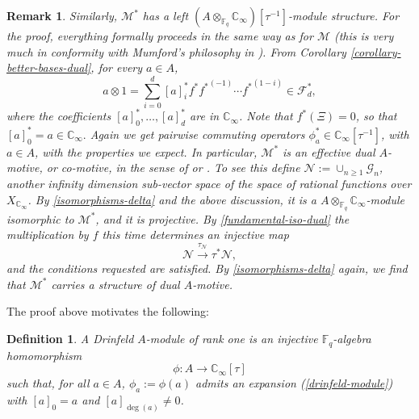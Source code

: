 \documentclass[11pt]{amsart}
\numberwithin{equation}{section}
\newcommand{\FF}{\mathbb{F}}
\newcommand{\CC}{\mathbb{C}}
\newtheorem{Definition}[Theorem]{Definition}
\newtheorem{Remark}[Theorem]{Remark}
\begin{document}
\begin{Remark}{\em 
Similarly, $\mathcal{M}^*$ has a left $(A\otimes_{\FF_q}\CC_\infty)[\tau^{-1}]$-module structure. For the proof, everything formally proceeds in the same way as for $\mathcal{M}$ (this is very much in conformity with Mumford's philosophy in \cite{MUM}). From Corollary \ref{corollary-better-bases-dual}, for every $a\in A$, 
$$a\otimes1=\sum_{i=0}^{d}[a]^*_i{f^*}{f^*}^{(-1)}\cdots {f^*}^{(1-i)}\in\mathcal{F}^*_d,$$
where the coefficients $[a]^*_0,\ldots,[a]^*_d$ are in $\CC_\infty$. Note that $f^*(\Xi)=0$, so that
$[a]^*_0=a\in\CC_\infty.$ Again we get pairwise commuting operators
$\phi^*_a\in\CC_\infty[\tau^{-1}]$, with $a\in A$, with the properties we expect. In particular, $\mathcal{M}^*$ is an {\em effective dual $A$-motive}, or {\em co-motive}, in the sense of \cite[Definition 2.4.1]{HAR&JUS} or \cite[Definition 3.6]{GAZ&MAU}. To see this define $\mathcal{N}:=\cup_{n\geq1}\mathcal{G}_n$, another infinity dimension sub-vector space of the space of rational functions over $X_{\CC_\infty}$. By \eqref{isomorphisms-delta} and the above discussion, it is a $A\otimes_{\FF_q}\CC_\infty$-module isomorphic to $\mathcal{M}^*$, and it is projective. By \eqref{fundamental-iso-dual} the multiplication by $f$ this time determines an injective map 
$$\mathcal{N}\xrightarrow{\tau_\mathcal{N}}\tau^*\mathcal{N},$$ and the conditions requested are satisfied. By \eqref{isomorphisms-delta} again, we find that $\mathcal{M}^*$ carries a structure of dual $A$-motive.
}
\end{Remark}

The proof above motivates the following:

\begin{Definition}\label{definition-Drinfeld}{\em A {\em Drinfeld $A$-module of rank one} is an injective $\FF_q$-algebra homomorphism
$$\phi: A\rightarrow\CC_\infty[\tau]$$
such that, for all $a\in A$, $\phi_a:=\phi(a)$ admits an expansion (\ref{drinfeld-module}) with $[a]_0=a$ and $[a]_{\deg(a)}\neq 0$.}
\end{Definition}
\end{document}
